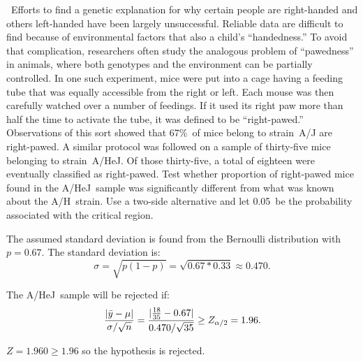 \begin{problem}
  ~Efforts to find a genetic explanation for why certain people are right-handed and others left-handed have been largely unsuccessful. Reliable data are difficult to find because of environmental factors that also a child's ``handedness.''  To avoid that complication, researchers often study the analogous problem of ``pawedness'' in animals, where both genotypes and the environment can be partially controlled. In one such experiment, mice were put into a cage having a feeding tube that was equally accessible from the right or left.  Each mouse was then carefully watched over a number of feedings.  If it used its right paw more than half the time to activate the tube, it was defined to be ``right-pawed.'' Observations of this sort showed that 67\%~of mice belong to strain~A/J are right-pawed. A similar protocol was followed on a sample of thirty-five mice belonging to strain~A/HeJ. Of those thirty-five, a total of eighteen were eventually classified as right-pawed. Test whether proportion of right-pawed mice found in the A/HeJ~sample was significantly different from what was known about the A/H~strain.  Use a two-side alternative and let 0.05~be the probability associated with the critical region.
\end{problem}

\noindent
The assumed standard deviation is found from the Bernoulli distribution with~${p=0.67}$. The standard deviation is:
\begin{equation*}
  \sigma = \sqrt{p(1-p)} = \sqrt{0.67 * 0.33} \approx 0.470\text{.}
\end{equation*}

\noindent
The A/HeJ~sample will be rejected if:
\begin{equation*}
  \frac{\lvert\bar{y} - \mu\rvert}{\sigma / \sqrt{n}} = \frac{\lvert\frac{18}{35} - 0.67\rvert}{0.470 / \sqrt{35}} \geq Z_{\alpha /2} = 1.96 \text{.}
\end{equation*}

\noindent
${Z = 1.960 \geq 1.96}$ so the hypothesis is rejected.
